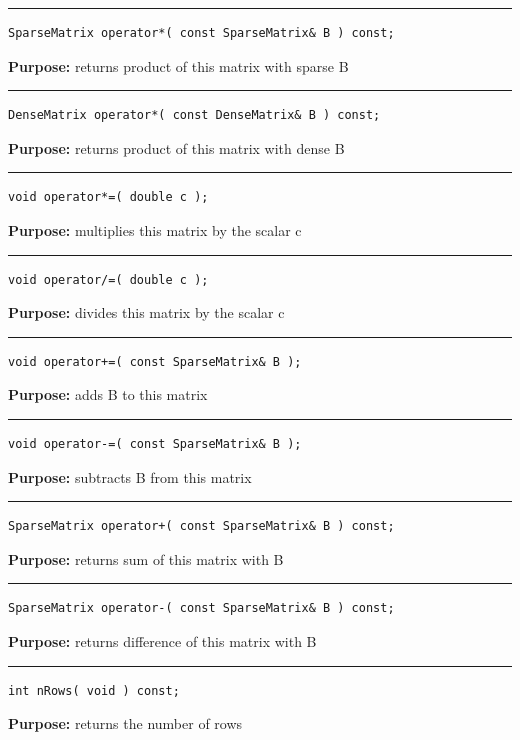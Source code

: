 \documentclass{article}
\begin{document}
\hspace{-.21in}\rule{5in}{1pt}
\begin{verbatim}
SparseMatrix operator*( const SparseMatrix& B ) const;
\end{verbatim}
\textbf{Purpose:}
returns product of this matrix with sparse B

\hspace{-.21in}\rule{5in}{1pt}
\begin{verbatim}
DenseMatrix operator*( const DenseMatrix& B ) const;
\end{verbatim}
\textbf{Purpose:}
returns product of this matrix with dense B

\hspace{-.21in}\rule{5in}{1pt}
\begin{verbatim}
void operator*=( double c );
\end{verbatim}
\textbf{Purpose:}
multiplies this matrix by the scalar c

\hspace{-.21in}\rule{5in}{1pt}
\begin{verbatim}
void operator/=( double c );
\end{verbatim}
\textbf{Purpose:}
divides this matrix by the scalar c

\hspace{-.21in}\rule{5in}{1pt}
\begin{verbatim}
void operator+=( const SparseMatrix& B );
\end{verbatim}
\textbf{Purpose:}
adds B to this matrix

\hspace{-.21in}\rule{5in}{1pt}
\begin{verbatim}
void operator-=( const SparseMatrix& B );
\end{verbatim}
\textbf{Purpose:}
subtracts B from this matrix

\hspace{-.21in}\rule{5in}{1pt}
\begin{verbatim}
SparseMatrix operator+( const SparseMatrix& B ) const;
\end{verbatim}
\textbf{Purpose:}
returns sum of this matrix with B

\hspace{-.21in}\rule{5in}{1pt}
\begin{verbatim}
SparseMatrix operator-( const SparseMatrix& B ) const;
\end{verbatim}
\textbf{Purpose:}
returns difference of this matrix with B

\hspace{-.21in}\rule{5in}{1pt}
\begin{verbatim}
int nRows( void ) const;
\end{verbatim}
\textbf{Purpose:}
returns the number of rows
\end{document}
